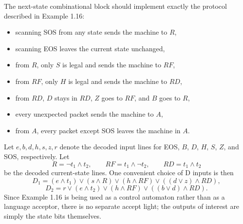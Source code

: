 \documentclass[11pt,openany]{book}
\def\<{\text{\textless}}
\def\>{\text{\textgreater}}
\begin{document}
\begin{enumerate}[{1.}1.]
The next-state combinational block should implement exactly the protocol described in Example 1.16:
\begin{itemize}
\item scanning \<SOS\> from any state sends the machine to $R$,
\item scanning \<EOS\> leaves the current state unchanged,
\item from $R$, only $S$ is legal and sends the machine to $RF$,
\item from $RF$, only $H$ is legal and sends the machine to $RD$,
\item from $RD$, $D$ stays in $RD$, $Z$ goes to $RF$, and $B$ goes to $R$,
\item every unexpected packet sends the machine to $A$,
\item from $A$, every packet except \<SOS\> leaves the machine in $A$.
\end{itemize}
Let $e,b,d,h,s,z,r$ denote the decoded input lines for \<EOS\>, $B$, $D$, $H$,
$S$, $Z$, and \<SOS\>, respectively. Let
\[
R=\neg t_1\wedge t_2,\qquad RF=t_1\wedge \neg t_2,\qquad RD=t_1\wedge t_2
\]
be the decoded current-state lines. One convenient choice of D inputs is then
\[
D_1=(e\wedge t_1)\vee(s\wedge R)\vee(h\wedge RF)\vee((d\vee z)\wedge RD),
\]
\[
D_2=r\vee(e\wedge t_2)\vee(h\wedge RF)\vee((b\vee d)\wedge RD).
\]
Since Example 1.16 is being used as a control automaton rather than as a language acceptor, there is no separate accept light; the outputs of interest are simply the state bits themselves.


\end{enumerate}
\end{document}
